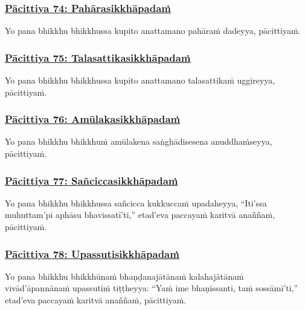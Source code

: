 \subsubsection*{\hyperref[exp74]{Pācittiya 74: Pahārasikkhāpadaṁ}}
\label{pac74}

Yo pana bhikkhu bhikkhussa kupito anattamano pahāraṁ dadeyya, pācittiyaṁ.



\subsubsection*{\hyperref[exp75]{Pācittiya 75: Talasattikasikkhāpadaṁ}}
\label{pac75}

Yo pana bhikkhu bhikkhussa kupito anattamano talasattikaṁ uggireyya, pācittiyaṁ.



\subsubsection*{\hyperref[exp76]{Pācittiya 76: Amūlakasikkhāpadaṁ}}
\label{pac76}

Yo pana bhikkhu bhikkhuṁ amūlakena saṅghādisesena anuddhaṁseyya, pācittiyaṁ.



\subsubsection*{\hyperref[exp77]{Pācittiya 77: Sañciccasikkhāpadaṁ}}
\label{pac77}

Yo pana bhikkhu bhikkhussa sañcicca kukkuccaṁ upadaheyya, ``Iti'ssa muhuttam'pi aphāsu bhavissatī'ti,'' etad'eva paccayaṁ karitvā anaññaṁ, pācittiyaṁ.



\subsubsection*{\hyperref[exp78]{Pācittiya 78: Upassutisikkhāpadaṁ}}
\label{pac78}

Yo pana bhikkhu bhikkhūnaṁ bhaṇḍanajātānaṁ kalahajātānaṁ vivād'āpannānaṁ upassutiṁ tiṭṭheyya: ``Yaṁ ime bhaṇissanti, taṁ sossāmī'ti,'' etad'eva paccayaṁ karitvā anaññaṁ, pācittiyaṁ.



